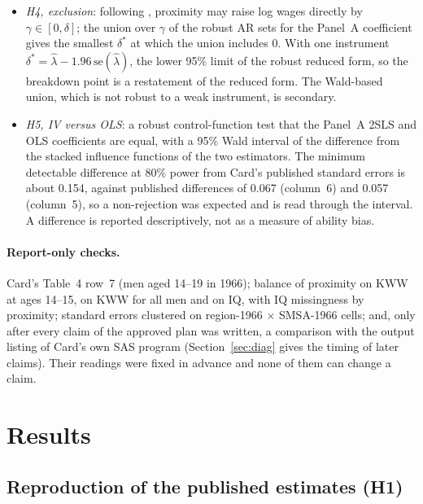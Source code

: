\documentclass[11pt]{article}
\begin{document}
\begin{itemize}
homoskedastic sets, has no robust option \citep{ivmodelsapi,londschien2026weak}. The rule
``the return to schooling is positive'' survives only if the robust projection set is one
bounded interval above 0; a set that contains 0 is reported as ``not established'', not as
evidence of no return.
\item \emph{H4, exclusion}: following \citet{conley2012plausibly}, proximity may raise log
wages directly by $\gamma \in [0, \delta]$; the union over $\gamma$ of the robust AR sets
for the Panel~A coefficient gives the smallest $\delta^*$ at which the union includes 0.
With one instrument $\delta^* = \hat\lambda - 1.96\,\mathrm{se}(\hat\lambda)$, the lower
95\% limit of the robust reduced form, so the breakdown point is a restatement of the
reduced form. The Wald-based union, which is not robust to a weak instrument, is secondary.
\item \emph{H5, IV versus OLS}: a robust control-function test that the Panel~A 2SLS and OLS
coefficients are equal, with a 95\% Wald interval of the difference from the stacked
influence functions of the two estimators. The minimum detectable difference at 80\% power
from Card's published standard errors is about 0.154, against published differences of %
0.067 (column~6) and 0.057 (column~5), so a non-rejection was expected and is read through %
the interval. A difference is reported descriptively, not as a measure of ability bias.
\end{itemize}

\paragraph{Report-only checks.} Card's Table~4 row~7 (men aged 14--19 in 1966); balance of
proximity on KWW at ages 14--15, on KWW for all men and on IQ, with IQ missingness by
proximity; standard errors clustered on region-1966 $\times$ SMSA-1966 cells; and, only
after every claim of the approved plan was written, a comparison with the output listing of
Card's own SAS program (Section~\ref{sec:diag} gives the timing of later claims). Their readings were fixed in advance and none of them can change a claim.

\section{Results}
\label{sec:results}

\subsection{Reproduction of the published estimates (H1)}
\label{sec:h1}
\end{document}
